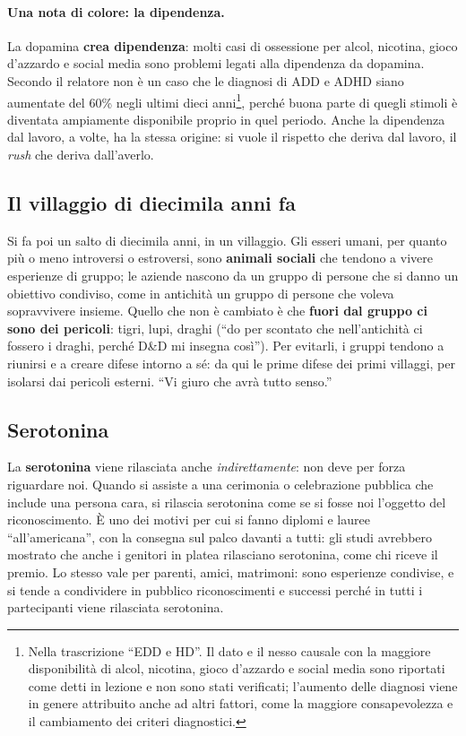 \paragraph{Una nota di colore: la dipendenza.} La dopamina \textbf{crea dipendenza}: molti casi
di ossessione per alcol, nicotina, gioco d'azzardo e social media sono problemi legati alla
dipendenza da dopamina. Secondo il relatore non è un caso che le diagnosi di ADD e ADHD siano
aumentate del 60\% negli ultimi dieci anni\footnote{Nella trascrizione ``EDD e HD''. Il dato
e il nesso causale con la maggiore disponibilità di alcol, nicotina, gioco d'azzardo e social
media sono riportati come detti in lezione e non sono stati verificati; l'aumento delle
diagnosi viene in genere attribuito anche ad altri fattori, come la maggiore consapevolezza e
il cambiamento dei criteri diagnostici.}, perché buona parte di quegli stimoli è diventata
ampiamente disponibile proprio in quel periodo. Anche la dipendenza dal lavoro, a volte, ha la
stessa origine: si vuole il rispetto che deriva dal lavoro, il \emph{rush} che deriva
dall'averlo.

\subsection{Il villaggio di diecimila anni fa}

Si fa poi un salto di diecimila anni, in un villaggio. Gli esseri umani, per quanto più o meno
introversi o estroversi, sono \textbf{animali sociali} che tendono a vivere esperienze di
gruppo; le aziende nascono da un gruppo di persone che si danno un obiettivo condiviso, come
in antichità un gruppo di persone che voleva sopravvivere insieme. Quello che non è cambiato è
che \textbf{fuori dal gruppo ci sono dei pericoli}: tigri, lupi, draghi (``do per scontato
che nell'antichità ci fossero i draghi, perché D\&D mi insegna così''). Per evitarli, i gruppi
tendono a riunirsi e a creare difese intorno a sé: da qui le prime difese dei primi villaggi,
per isolarsi dai pericoli esterni. ``Vi giuro che avrà tutto senso.''

\subsection{Serotonina}

La \textbf{serotonina} viene rilasciata anche \emph{indirettamente}: non deve per forza
riguardare noi. Quando si assiste a una cerimonia o celebrazione pubblica che include una
persona cara, si rilascia serotonina come se si fosse noi l'oggetto del riconoscimento. È uno
dei motivi per cui si fanno diplomi e lauree ``all'americana'', con la consegna sul palco
davanti a tutti: gli studi avrebbero mostrato che anche i genitori in platea rilasciano
serotonina, come chi riceve il premio. Lo stesso vale per parenti, amici, matrimoni: sono
esperienze condivise, e si tende a condividere in pubblico riconoscimenti e successi perché in
tutti i partecipanti viene rilasciata serotonina.

